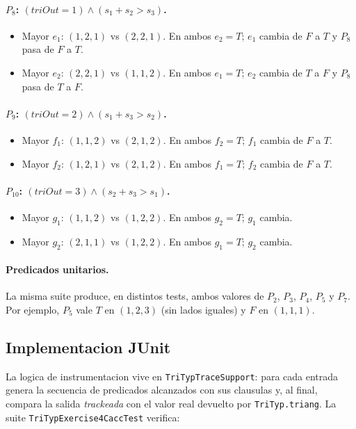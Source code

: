 \documentclass[12pt,a4paper]{article}
\begin{document}
\paragraph{$P_8$: $(\textit{triOut}=1) \wedge (s_1+s_2>s_3)$.}
\begin{itemize}
  \item Mayor $e_1$: $(1,2,1)$ vs $(2,2,1)$. En ambos $e_2=T$; $e_1$ cambia de $F$ a $T$ y $P_8$
  pasa de $F$ a $T$.
  \item Mayor $e_2$: $(2,2,1)$ vs $(1,1,2)$. En ambos $e_1=T$; $e_2$ cambia de $T$ a $F$ y $P_8$
  pasa de $T$ a $F$.
\end{itemize}

\paragraph{$P_9$: $(\textit{triOut}=2) \wedge (s_1+s_3>s_2)$.}
\begin{itemize}
  \item Mayor $f_1$: $(1,1,2)$ vs $(2,1,2)$. En ambos $f_2=T$; $f_1$ cambia de $F$ a $T$.
  \item Mayor $f_2$: $(1,2,1)$ vs $(2,1,2)$. En ambos $f_1=T$; $f_2$ cambia de $F$ a $T$.
\end{itemize}

\paragraph{$P_{10}$: $(\textit{triOut}=3) \wedge (s_2+s_3>s_1)$.}
\begin{itemize}
  \item Mayor $g_1$: $(1,1,2)$ vs $(1,2,2)$. En ambos $g_2=T$; $g_1$ cambia.
  \item Mayor $g_2$: $(2,1,1)$ vs $(1,2,2)$. En ambos $g_1=T$; $g_2$ cambia.
\end{itemize}

\paragraph{Predicados unitarios.} La misma suite produce, en distintos tests, ambos valores de
$P_2$, $P_3$, $P_4$, $P_5$ y $P_7$. Por ejemplo, $P_5$ vale $T$ en $(1,2,3)$ (sin lados iguales)
y $F$ en $(1,1,1)$.

\subsection{Implementacion JUnit}

La logica de instrumentacion vive en \texttt{TriTypTraceSupport}: para cada entrada genera la
secuencia de predicados alcanzados con sus clausulas y, al final, compara la salida
\textit{trackeada} con el valor real devuelto por \texttt{TriTyp.triang}. La suite
\texttt{TriTypExercise4CaccTest} verifica:
\end{document}
